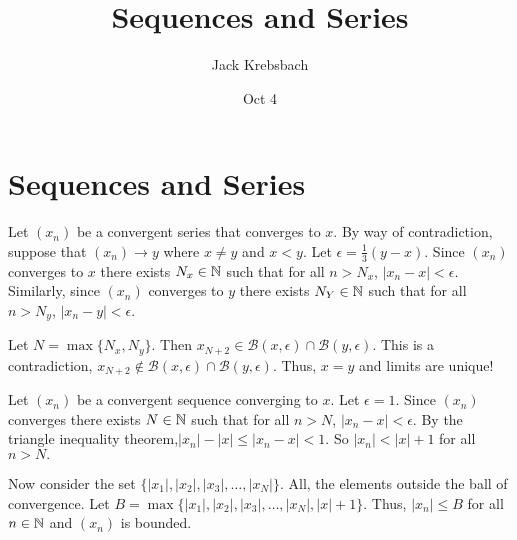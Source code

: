 \documentclass{report}
\title{Sequences and Series}
\author{Jack Krebsbach }
\date{Oct 4}
\begin{document}
\maketitle

\section{Sequences and Series}




\begin{myproof}
  Let $(x_n)$ be a convergent series that converges to $x.$ By way of contradiction, suppose that $(x_n) \rightarrow y$ where $x \neq y$ and $x < y$. Let $\epsilon = \frac{1}{3}(y-x).$  Since $(x_n)$ converges to $x$ there exists $N_x \in \NN$ such that for all $n> N_x$, $|x_n - x| < \epsilon.$ Similarly, since $(x_n)$ converges to $y$ there exists $N_Y \in \NN$ such that for all $n> N_y$, $|x_n - y| <\epsilon.$ 

  \par Let $N = \max\{N_x, N_y\}.$  Then $x_{N+2} \in \mathcal{B}(x,\epsilon) \cap \mathcal{B}(y,\epsilon)$. This is a contradiction, $x_{N+2} \not\in \mathcal{B}(x,\epsilon) \cap \mathcal{B}(y,\epsilon).$ Thus,  $x=y$ and limits are unique!
\end{myproof}



\begin{myproof}
Let $(x_n)$ be a convergent sequence converging to $x$. Let $\epsilon =1.$ Since $(x_n)$ converges there exists $N \in \NN$ such that for all $n> N$, $|x_n - x| <\epsilon.$ By the triangle inequality theorem,$|x_n| - |x| \leq |x_n -x| < 1.$ So $|x_n|< |x| +1$ for all $n >N.$
\par 
Now consider the set $\{|x_1|, |x_2|, |x_3|,\dots, |x_N|\}.$ All, the elements outside the ball of convergence.  Let $B= \max\{|x_1|, |x_2|, |x_3|,\dots, |x_N|, |x| + 1\}.$ Thus, $|x_n| \leq B$ for all $n \in \NN$ and $(x_n)$ is bounded.
    
\end{myproof}
\end{document}
